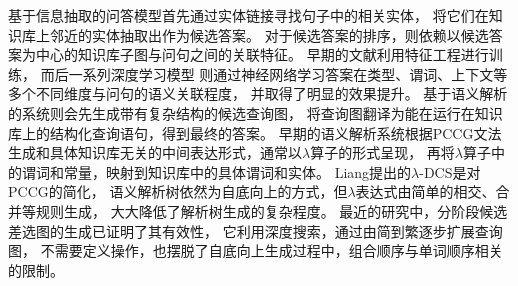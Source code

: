 基于信息抽取的问答模型首先通过实体链接寻找句子中的相关实体，
将它们在知识库上邻近的实体抽取出作为候选答案。
对于候选答案的排序，则依赖以候选答案为中心的知识库子图与问句之间的关联特征。
早期的文献\parencite{yao2014information}利用特征工程进行训练，
而后一系列深度学习模型\cite{bordes2014question,dong2015question,hao2017end}
则通过神经网络学习答案在类型、谓词、上下文等多个不同维度与问句的语义关联程度，
并取得了明显的效果提升。
基于语义解析的系统则会先生成带有复杂结构的候选查询图，
将查询图翻译为能在运行在知识库上的结构化查询语句，得到最终的答案。
早期的语义解析系统\cite{kwiatkowski2013scaling,cai2013large}根据PCCG文法
生成和具体知识库无关的中间表达形式，通常以$\lambda$算子的形式呈现，
再将$\lambda$算子中的谓词和常量，映射到知识库中的具体谓词和实体。
Liang提出的$\lambda$-DCS\cite{liang2013lambda}是对PCCG的简化，
语义解析树依然为自底向上的方式，但$\lambda$表达式由简单的相交、合并等规则生成，
大大降低了解析树生成的复杂程度。
最近的研究中，分阶段候选差选图的生成\cite{yih2015semantic,bao2016constraint}已证明了其有效性，
它利用深度搜索，通过由简到繁逐步扩展查询图，
不需要定义操作，也摆脱了自底向上生成过程中，组合顺序与单词顺序相关的限制。



